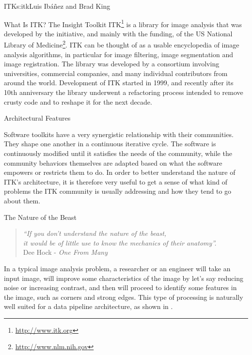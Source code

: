 \begin{aosachapter}{ITK}{s:itk}{Luis Ib\'{a}\~{n}ez and Brad King}


\begin{aosasect1}{What Is ITK?}
The Insight Toolkit ITK\footnote{\url{http://www.itk.org}} is a library for
image analysis that was developed by the initiative, and mainly with the
funding, of the US National Library of
Medicine\footnote{\url{http://www.nlm.nih.gov}}. ITK can be thought of as a
usable encyclopedia of image analysis algorithms, in particular for image
filtering, image segmentation and image registration. The library was developed
by a consortium involving universities, commercial companies, and many
individual contributors from around the world.  Development of ITK started in
1999, and recently after its 10th anniversary the library underwent a
refactoring process intended to remove crusty code and to reshape it for the
next decade.
\end{aosasect1}

\begin{aosasect1}{Architectural Features}

Software toolkits have a very synergistic relationship with their communities.
They shape one another in a continuous iterative cycle.  The software is continuously modified until it satisfies the needs of the community, while the community
behaviors themselves are adapted based on what the software empowers or
restricts them to do. In order to better understand the nature of ITK's
architecture, it is therefore very useful to get a sense of what kind of
problems the ITK community is usually addressing and how they tend to go about
them.

\begin{aosasect2}{The Nature of the Beast}

\begin{center}
\begin{quotation}
\emph{
``If you don't understand the nature of the beast,\\
it would be of little use to know the mechanics of their anatomy''.\\
}
\hfill Dee Hock - \emph{One From Many}
\end{quotation}
\end{center}

In a typical image analysis problem, a researcher or an engineer will take an
input image, will improve some characteristics of the image by let's say
reducing noise or increasing contrast, and then will proceed to identify some
features in the image, such as corners and strong edges. This type of
processing is naturally well suited for a data pipeline architecture, as
shown in .


\end{aosasect2}
\end{aosasect1}
\end{aosachapter}
